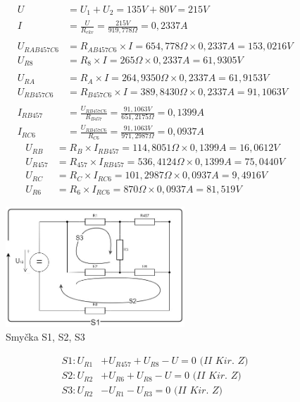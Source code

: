 \begin{align*}
U &= U_1 + U_2 = 135V + 80V = 215 V\\
I &= \frac {U} {R_{ekv}} = \frac {215V} {919,778\Omega} = 0,2337 A\\ \\
U_{RAB457C6} &= R_{AB457C6} \times I = 654,778\Omega \times 0,2337 A = 153,0216 V\\
U_{R8} &= R_8 \times I = 265\Omega \times 0,2337 A = 61,9305 V\\ \\
U_{RA} &= R_A \times I = 264,9350\Omega \times 0,2337 A = 61,9153 V\\
U_{RB457C6} &= R_{B457C6} \times I = 389,8430\Omega \times 0,2337 A = 91,1063 V\\ \\
I_{RB457} &= \frac {U_{RB457C6}} {R_{B457}} = \frac {91,1063 V} {651,2175\Omega} = 0,1399 A\\
I_{RC6} &= \frac {U_{RB457C6}} {R_{C6}} = \frac {91,1063 V} {971,2987\Omega} = 0,0937 A
\end{align*}
\begin{align*}
U_{RB} &= R_B \times I_{RB457} = 114,8051\Omega \times 0,1399 A = 16,0612 V\\
U_{R457} &= R_{457} \times I_{RB457} = 536,4124\Omega \times 0,1399 A = 75,0440 V\\
U_{RC} &= R_C \times I_{RC6} = 101,2987\Omega \times 0,0937 A = 9,4916 V\\
U_{R6} &= R_6 \times I_{RC6} = 870\Omega \times 0,0937 A = 81,519 V
\end{align*}
\begin{figure}[H]
    \centering
    \includegraphics[width=0.6\textwidth]{fig/Pr1_7.jpg}
    \caption{Smyčka S1, S2, S3}
\end{figure}
\begin{align*}
S1: U_{R1} &+ U_{R457} + U_{R8} - U = 0 \textit{ (II Kir. Z)}\\
S2: U_{R2} &+ U_{R6} + U_{R8} - U = 0 \textit{ (II Kir. Z)}\\
S3: U_{R2} &- U_{R1} - U_{R3} = 0 \textit{ (II Kir. Z)}
\end{align*}
